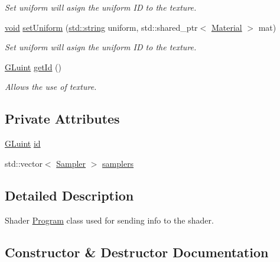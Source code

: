 \begin{DoxyCompactItemize}
\begin{DoxyCompactList}\small\item\em Set uniform will asign the uniform ID to the texture. \end{DoxyCompactList}\item 
\mbox{\hyperlink{_s_d_l__opengles2__gl2ext_8h_ae5d8fa23ad07c48bb609509eae494c95}{void}} \mbox{\hyperlink{class_aspect_1_1_engine_1_1_shader_program_abfaf605b8dfade33b086b2f33e07762b}{set\+Uniform}} (\mbox{\hyperlink{_s_d_l__opengl__glext_8h_ae84541b4f3d8e1ea24ec0f466a8c568b}{std\+::string}} uniform, std\+::shared\+\_\+ptr$<$ \mbox{\hyperlink{class_aspect_1_1_engine_1_1_material}{Material}} $>$ mat)
\begin{DoxyCompactList}\small\item\em Set uniform will asign the uniform ID to the texture. \end{DoxyCompactList}\item 
\mbox{\hyperlink{glew_8h_a68c4714e43d8e827d80759f9cb864f3c}{G\+Luint}} \mbox{\hyperlink{class_aspect_1_1_engine_1_1_shader_program_a78a54e4a39c3e605f7a5832e6ce7f692}{get\+Id}} ()
\begin{DoxyCompactList}\small\item\em Allows the use of texture. \end{DoxyCompactList}\end{DoxyCompactItemize}
\subsection*{Private Attributes}
\begin{DoxyCompactItemize}
\item 
\mbox{\hyperlink{glew_8h_a68c4714e43d8e827d80759f9cb864f3c}{G\+Luint}} \mbox{\hyperlink{class_aspect_1_1_engine_1_1_shader_program_ad0427969ef1bc979a2da581799600b43}{id}}
\item 
std\+::vector$<$ \mbox{\hyperlink{struct_aspect_1_1_engine_1_1_sampler}{Sampler}} $>$ \mbox{\hyperlink{class_aspect_1_1_engine_1_1_shader_program_a30a7520fca74b5c529368bd6675ba79f}{samplers}}
\end{DoxyCompactItemize}


\subsection{Detailed Description}
Shader \mbox{\hyperlink{class_aspect_1_1_engine_1_1_program}{Program}} class used for sending info to the shader. 

\subsection{Constructor \& Destructor Documentation}
\mbox{\label{class_aspect_1_1_engine_1_1_shader_program_acfd947e0ce600660979f192b80fb41ea}} 
